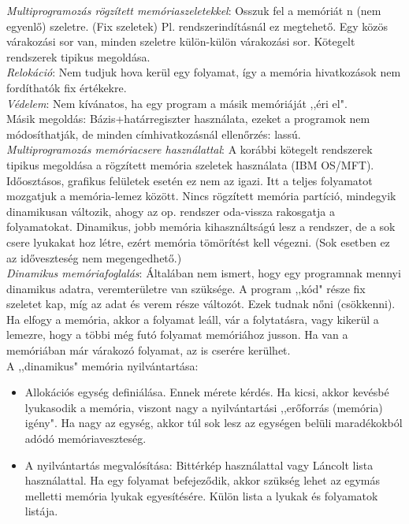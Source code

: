 \documentclass[margin=0px]{article}
\begin{document}
	\textit{Multiprogramozás rögzített memóriaszeletekkel}: Osszuk fel a memóriát n (nem egyenlő) szeletre. (Fix szeletek) Pl. rendszerindításnál ez megtehető. Egy közös várakozási sor van, minden szeletre külön-külön várakozási sor. Kötegelt rendszerek tipikus megoldása. \\
	\textit{Relokáció}: Nem tudjuk hova kerül egy folyamat, így a memória hivatkozások nem fordíthatók fix értékekre. \\
	\textit{Védelem}: Nem kívánatos, ha egy program a másik memóriáját ,,éri el". \\
	Másik megoldás: Bázis+határregiszter használata, ezeket a programok nem módosíthatják, de minden címhivatkozásnál ellenőrzés: lassú. \\
	\textit{Multiprogramozás memóriacsere használattal}: A korábbi kötegelt rendszerek tipikus megoldása a	rögzített memória szeletek használata (IBM OS/MFT). Időosztásos, grafikus felületek esetén ez nem az igazi. Itt a teljes folyamatot mozgatjuk a memória-lemez között. Nincs rögzített memória partíció, mindegyik	dinamikusan változik, ahogy az op. rendszer oda-vissza rakosgatja a folyamatokat. Dinamikus, jobb memória kihasználtságú lesz a rendszer, de a sok csere lyukakat hoz létre, ezért memória tömörítést kell végezni. (Sok esetben ez az időveszteség nem megengedhető.) \\
	\textit{Dinamikus memóriafoglalás}: Általában nem ismert, hogy egy programnak mennyi dinamikus adatra, veremterületre van szüksége. A program ,,kód" része fix szeletet kap, míg az adat és verem része változót. Ezek tudnak nőni (csökkenni). Ha elfogy a memória, akkor a folyamat leáll, vár a
	folytatásra, vagy kikerül a lemezre, hogy a többi még futó folyamat memóriához jusson. Ha van a memóriában már várakozó folyamat, az is cserére kerülhet. \\
	A ,,dinamikus" memória nyilvántartása: 
	\begin{itemize}
		\item Allokációs egység definiálása. Ennek mérete kérdés. Ha kicsi, akkor kevésbé lyukasodik a memória, viszont nagy a nyilvántartási ,,erőforrás (memória) igény". Ha nagy az egység, akkor túl sok lesz az egységen belüli maradékokból adódó memóriaveszteség.
		\item A nyilvántartás megvalósítása: Bittérkép használattal vagy Láncolt lista használattal. Ha egy folyamat befejeződik, akkor szükség lehet az egymás melletti memória lyukak egyesítésére. Külön lista a lyukak és folyamatok listája.
	\end{itemize}
\end{document}
